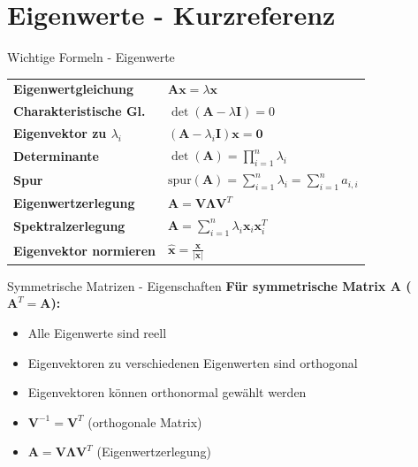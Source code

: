 \documentclass[a4paper, fontsize=7pt]{scrartcl}
\renewcommand*{\arraystretch}{1.5}
\begin{document}
\section{Eigenwerte - Kurzreferenz}

\begin{mainbox}{Wichtige Formeln - Eigenwerte}
\renewcommand*{\arraystretch}{1.3}
\begin{tabularx}{\linewidth}{lX}
\textbf{Eigenwertgleichung} & $\mathbf{Ax} = \lambda\mathbf{x}$ \\[2mm]
\textbf{Charakteristische Gl.} & $\det(\mathbf{A} - \lambda\mathbf{I}) = 0$ \\[2mm]
\textbf{Eigenvektor zu $\lambda_i$} & $(\mathbf{A} - \lambda_i\mathbf{I})\mathbf{x} = \mathbf{0}$ \\[2mm]
\textbf{Determinante} & $\det(\mathbf{A}) = \prod_{i=1}^{n} \lambda_i$ \\[2mm]
\textbf{Spur} & $\text{spur}(\mathbf{A}) = \sum_{i=1}^{n} \lambda_i = \sum_{i=1}^{n} a_{i,i}$ \\[2mm]
\textbf{Eigenwertzerlegung} & $\mathbf{A} = \mathbf{V\Lambda V}^T$ \\[2mm]
\textbf{Spektralzerlegung} & $\mathbf{A} = \sum_{i=1}^{n} \lambda_i\mathbf{x}_i\mathbf{x}_i^T$ \\[2mm]
\textbf{Eigenvektor normieren} & $\hat{\mathbf{x}} = \frac{\mathbf{x}}{|\mathbf{x}|}$
\end{tabularx}
\end{mainbox}

\begin{subbox}{Symmetrische Matrizen - Eigenschaften}
\textbf{Für symmetrische Matrix $\mathbf{A}$ ($\mathbf{A}^T = \mathbf{A}$):}
\begin{itemize}
    \item Alle Eigenwerte sind reell
    \item Eigenvektoren zu verschiedenen Eigenwerten sind orthogonal
    \item Eigenvektoren können orthonormal gewählt werden
    \item $\mathbf{V}^{-1} = \mathbf{V}^T$ (orthogonale Matrix)
    \item $\mathbf{A} = \mathbf{V\Lambda V}^T$ (Eigenwertzerlegung)
\end{itemize}
\end{subbox}

\end{document}
